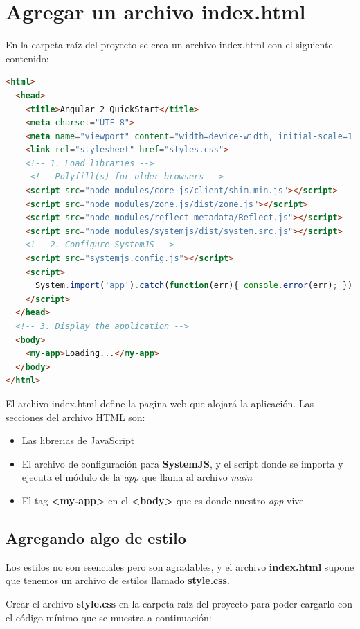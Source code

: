 \documentclass[12pt,twoside]{book}
\begin{document}
\section{Agregar un archivo index.html}

En la carpeta raíz del proyecto se crea un archivo index.html con el siguiente contenido:


\begin{lstlisting}[language=html]
<html>
  <head>
    <title>Angular 2 QuickStart</title>
    <meta charset="UTF-8">
    <meta name="viewport" content="width=device-width, initial-scale=1">
    <link rel="stylesheet" href="styles.css">
    <!-- 1. Load libraries -->
     <!-- Polyfill(s) for older browsers -->
    <script src="node_modules/core-js/client/shim.min.js"></script>
    <script src="node_modules/zone.js/dist/zone.js"></script>
    <script src="node_modules/reflect-metadata/Reflect.js"></script>
    <script src="node_modules/systemjs/dist/system.src.js"></script>
    <!-- 2. Configure SystemJS -->
    <script src="systemjs.config.js"></script>
    <script>
      System.import('app').catch(function(err){ console.error(err); });
    </script>
  </head>
  <!-- 3. Display the application -->
  <body>
    <my-app>Loading...</my-app>
  </body>
</html>
\end{lstlisting}

El archivo index.html define la pagina web que alojará la aplicación. Las secciones del archivo HTML son:

\begin{itemize}
\item Las librerias de JavaScript
\item El archivo de configuración para \textbf{SystemJS}, y el script donde se importa y ejecuta el módulo de la \textit{app} que llama al archivo \textit{main} 
\item El tag \textbf{<my-app>} en el \textbf{<body>} que es donde nuestro \textit{app} vive.
\end{itemize}

\subsection{Agregando algo de estilo}
Los estilos no son esenciales pero son agradables, y el archivo \textbf{index.html} supone que tenemos un archivo de estilos llamado \textbf{style.css}.

Crear el archivo \textbf{style.css} en la carpeta raíz del proyecto para poder cargarlo con el código mínimo que se muestra a continuación:
\end{document}

